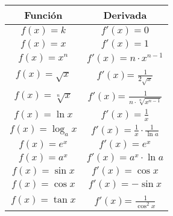 \newpage

\begin{tabular}{|c|c|}\hline 
Función  & Derivada  \\ 
\hline
$f(x) = k$  & $f'(x) = 0$   \\ 
$f(x) = x$  &                     $f'(x)= 1$ \\
$f(x) = x^n$ &                    $f'(x)= n\cdot x^{n-1}$\\
$f(x) = \sqrt x $ &      $f'(x)$= $\frac{1}{{2\sqrt x }}$\\
$f(x) = \sqrt[n]{x}$  &     $f'(x)$= $\frac{1}{n\cdot\sqrt[n]{x^{n - 1}}}$\\
$f(x) = \ln{x}$ &                  $f'(x)= \frac{1}{x}$\\
$f(x) = \log_a x$ &              $f'(x)=\frac{1}{x}\cdot\frac{1}{\ln a}$\\
$f(x) = e^x$ &                     $f'(x)=e^x$\\
$f(x) = a^x$ &                     $f'(x)= a^x\cdot\ln a$\\
$f(x) = \sin x$ &               $f'(x)= \cos x$ \\
$f(x) = \cos x$  &              $f'(x)= -\sin x$\\
$f(x) = \tan x$ &                  $f'(x)$= $\frac{1}{{{{\cos }^2}x}}$\\
\hline

\end{tabular} 

                      




%
%
